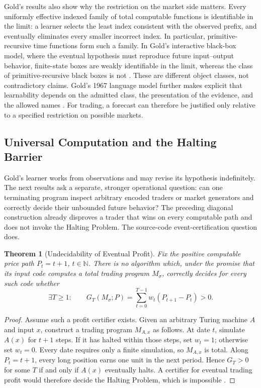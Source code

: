 \documentclass[aps,pra,reprint,superscriptaddress,amsmath,amssymb,floatfix]{revtex4-2}
\theoremstyle{plain}
\newtheorem{theorem}{Theorem}
\theoremstyle{definition}
\theoremstyle{remark}
\begin{document}
Gold's results also show why the restriction on the market side matters. Every
uniformly effective indexed family of total computable functions is
identifiable in the limit: a learner selects the least index consistent with
the observed prefix, and eventually eliminates every smaller incorrect index.
In particular, primitive-recursive time functions form such a family. In Gold's interactive
black-box model, where the eventual hypothesis must reproduce future
input--output behavior, finite-state boxes are weakly identifiable in the
limit, whereas the class of primitive-recursive black boxes is not
\cite{go-65}. These are different object classes, not contradictory claims.
Gold's 1967 language model further makes explicit that learnability depends on
the admitted class, the presentation of the evidence, and the allowed names
\cite{go-67}. For trading, a forecast can therefore be justified only relative
to a specified restriction on possible markets.

\subsection{Universal Computation and the Halting Barrier}

Gold's learner works from observations and may revise its hypothesis
indefinitely. The next results ask a separate, stronger operational question:
can one terminating program inspect arbitrary encoded traders or market
generators and correctly decide their unbounded future behavior? The preceding
diagonal construction already disproves a trader that wins on every computable
path and does not invoke the Halting Problem. The source-code
event-certification question does.

\begin{theorem}[Undecidability of Eventual Profit]
  \label{thm:profit-undecidable}
  Fix the positive computable price path \(P_t=t+1\), \(t\in\mathbb{N}\).
  There is no algorithm which, under the promise that its input code computes
  a total trading program \(M_\sigma\), correctly decides for every such code
  whether
  \[
    \exists T\geq1:\qquad
    G_T(M_\sigma;P)=
    \sum_{t=0}^{T-1}w_t(P_{t+1}-P_t)>0.
  \]
\end{theorem}

\begin{proof}
Assume such a profit certifier exists. Given an arbitrary Turing machine
\(A\) and input \(x\), construct a trading program \(M_{A,x}\) as follows.
At date \(t\), simulate \(A(x)\) for \(t+1\) steps. If it has halted within
those steps, set \(w_t=1\); otherwise set \(w_t=0\). Every date requires only
a finite simulation, so \(M_{A,x}\) is total. Along \(P_t=t+1\), every long
position earns one unit in the next period. Hence \(G_T>0\) for some \(T\) if
and only if \(A(x)\) eventually halts. A certifier for eventual trading profit
would therefore decide the Halting Problem, which is impossible
\cite{turing-36}.
\end{proof}
\end{document}
